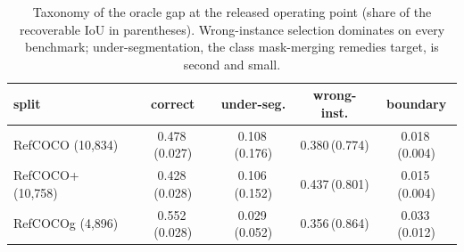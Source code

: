 \begin{table}[t]
\centering
\footnotesize
\setlength{\tabcolsep}{4pt}
\caption{Taxonomy of the oracle gap at the released operating point (share of the recoverable IoU in parentheses). Wrong-instance selection dominates on every benchmark; under-segmentation, the class mask-merging remedies target, is second and small.}
\label{tab:taxonomy}
\begin{tabular}{@{}lcccc@{}}
\toprule
split & correct & under-seg. & wrong-inst. & boundary \\
\midrule
RefCOCO (10{,}834) & 0.478\,(0.027) & 0.108\,(0.176) & 0.380\,(0.774) & 0.018\,(0.004) \\
RefCOCO+ (10{,}758) & 0.428\,(0.028) & 0.106\,(0.152) & 0.437\,(0.801) & 0.015\,(0.004) \\
RefCOCOg (4{,}896) & 0.552\,(0.028) & 0.029\,(0.052) & 0.356\,(0.864) & 0.033\,(0.012) \\
\bottomrule
\end{tabular}
\end{table}
